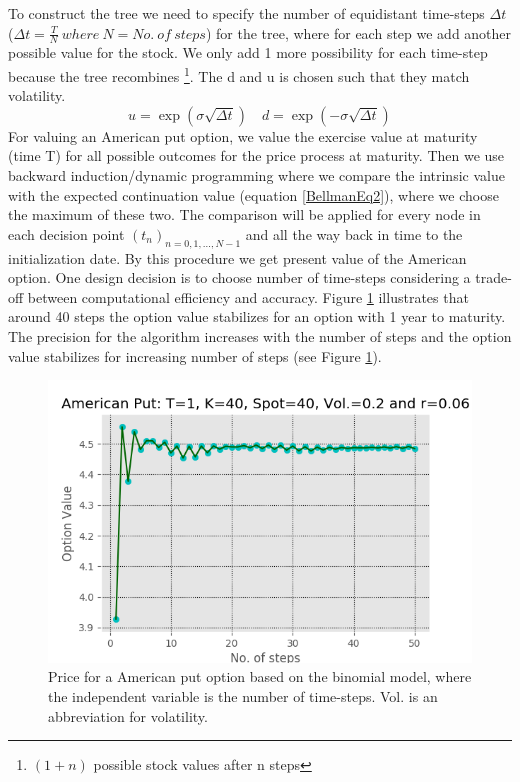 To construct the tree we need to specify the number of equidistant time-steps $\Delta t$ ($\Delta t = \frac{T}{N} \ where \ N=No. \ of  \ steps$) for the tree, where for each step we add another possible value for the stock. We only add 1 more possibility for each time-step because the tree recombines \footnote{$(1+n)$ possible stock values after n steps}. The d and u is chosen such that they match volatility.
$$u= \exp(\sigma \sqrt{\Delta t}) \quad d= \exp(-\sigma \sqrt{\Delta t})$$
For valuing an American put option, we value the exercise value at maturity (time T) for all possible outcomes for the price process at maturity. Then we use backward induction/dynamic programming where we compare the intrinsic value with the expected continuation value (equation \eqref{BellmanEq2}), where we choose the maximum of these two. The comparison will be applied for every node in each decision point $(t_{n})_{n=0,1,\ldots,N-1}$ and all the way back in time to the initialization date. By this procedure we get present value of the American option. One design decision is to choose number of time-steps considering a trade-off between computational efficiency and accuracy. Figure \ref{fig:binConv} illustrates that around 40 steps the option value stabilizes for an option with 1 year to maturity. The precision for the algorithm increases with the number of steps and the option value stabilizes for increasing number of steps (see Figure \ref{fig:binConv}).\\

\begin{figure}[th]
\centering
\includegraphics{Figures/binConv.png}
\decoRule
\caption[Convergence Of Binomial Model]{Price for a American put option based on the binomial model, where the independent variable is the number of time-steps. Vol. is an abbreviation for volatility.}
\label{fig:binConv}
\end{figure}

